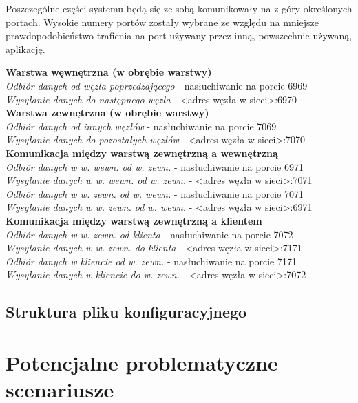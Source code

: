 \par{Poszczególne części systemu będą się ze sobą komunikowały na z góry określonych portach. Wysokie numery portów zostały wybrane ze względu na mniejsze prawdopodobieństwo trafienia na port używany przez inną, powszechnie używaną, aplikację.}


\textbf{Warstwa węwnętrzna (w obrębie warstwy)} \\
\textit{Odbiór danych od węzła poprzedzającego} - nasłuchiwanie na porcie 6969 \\
\textit{Wysyłanie danych do następnego węzła} - <adres węzła w sieci>:6970 \\

\textbf{Warstwa zewnętrzna (w obrębie warstwy)} \\
\textit{Odbiór danych od innych węzłów} - nasłuchiwanie na porcie 7069 \\
\textit{Wysyłanie danych do pozostałych węzłów} - <adres węzła w sieci>:7070 \\

\textbf{Komunikacja między warstwą zewnętrzną a wewnętrzną} \\
\textit{Odbiór danych w w. wewn. od w. zewn.} - nasłuchiwanie na porcie 6971 \\
\textit{Wysyłanie danych w w. wewn. od w. zewn.} - <adres węzła w sieci>:7071 \\
\textit{Odbiór danych w w. zewn. od w. wewn.} - nasłuchiwanie na porcie 7071 \\
\textit{Wysyłanie danych w w. zewn. od w. wewn.} - <adres węzła w sieci>:6971 \\

\textbf{Komunikacja między warstwą zewnętrzną a klientem} \\
\textit{Odbiór danych w w. zewn. od klienta} - nasłuchiwanie na porcie 7072 \\
\textit{Wysyłanie danych w w. zewn. do klienta} - <adres węzła w sieci>:7171 \\
\textit{Odbiór danych w kliencie od w. zewn.} - nasłuchiwanie na porcie 7171 \\
\textit{Wysyłanie danych w kliencie do w. zewn.} - <adres węzła w sieci>:7072 \\


\subsection[Struktura pliku konfiguracyjnego]{Struktura pliku konfiguracyjnego}


\section[Potencjalne problematyczne scenariusze]{Potencjalne problematyczne scenariusze}

